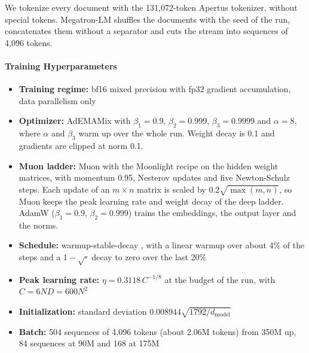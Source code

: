 We tokenize every document with the 131,072-token Apertus tokenizer, without special tokens. Megatron-LM shuffles the documents with the seed of the run, concatenates them without a separator and cuts the stream into sequences of 4,096 tokens.

\paragraph{Training Hyperparameters}

\begin{itemize}[itemsep=1pt,topsep=2pt]
    \item \textbf{Training regime:} bf16 mixed precision with fp32 gradient accumulation, data parallelism only
    \item \textbf{Optimizer:} AdEMAMix \citep{pagliardini_ademamix_2024} with $\beta_1 = 0.9$, $\beta_2 = 0.999$, $\beta_3 = 0.9999$ and $\alpha = 8$, where $\alpha$ and $\beta_3$ warm up over the whole run. Weight decay is 0.1 and gradients are clipped at norm 0.1.
    \item \textbf{Muon ladder:} Muon \citep{jordan_muon_2024} with the Moonlight recipe \citep{liu_muon_2025} on the hidden weight matrices, with momentum 0.95, Nesterov updates and five Newton-Schulz steps. Each update of an $m \times n$ matrix is scaled by $0.2\sqrt{\max(m, n)}$, so Muon keeps the peak learning rate and weight decay of the deep ladder. AdamW ($\beta_1 = 0.9$, $\beta_2 = 0.999$) trains the embeddings, the output layer and the norms.
    \item \textbf{Schedule:} warmup-stable-decay \citep{hagele_scaling_2024}, with a linear warmup over about 4\% of the steps and a $1-\sqrt{\cdot}$ decay to zero over the last 20\%
    \item \textbf{Peak learning rate:} $\eta = 0.3118\, C^{-1/8}$ at the budget of the run, with $C = 6ND = 600N^2$
    \item \textbf{Initialization:} standard deviation $0.008944\sqrt{1792/d_{\mathrm{model}}}$
    \item \textbf{Batch:} 504 sequences of 4,096 tokens (about 2.06M tokens) from 350M up, 84 sequences at 90M and 168 at 175M
\end{itemize}

